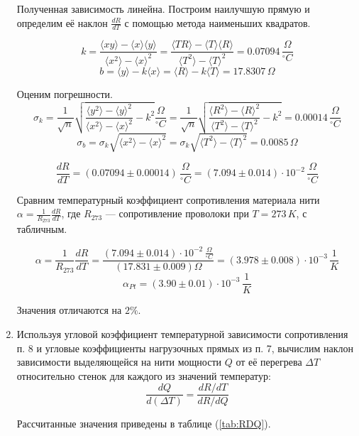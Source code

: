 \documentclass[a4paper,12pt]{article} %
\begin{document}
\begin{enumerate}
    Полученная зависимость линейна. Построим наилучшую прямую и определим её наклон $\frac{dR}{dT}$ с помощью метода наименьших квадратов. 

    \[
      k = \frac{\langle xy \rangle - \langle x \rangle \langle y \rangle}{\langle x^2 \rangle - \langle x \rangle ^2} 
      = \frac{\langle TR \rangle - \langle T \rangle \langle R \rangle}{\langle T^2 \rangle - \langle T \rangle ^2} 
      = 0.07094 \, \frac{{\Omega}}{^\circ C}
    \]
    \[
      b = \langle y \rangle - k \langle x \rangle 
      = \langle R \rangle - k \langle T \rangle = 17.8307 \, \Omega
    \]

    Оценим погрешности.
    \[
      \sigma_k = \frac{1}{\sqrt{n}} \sqrt{\frac{\langle y^2 \rangle - \langle y \rangle ^2}{\langle x^2 \rangle - \langle x \rangle ^2} - k^2} \frac{{\Omega}}{^\circ C}
      = \frac{1}{\sqrt{n}} \sqrt{\frac{\langle R^2 \rangle - \langle R \rangle ^2}{\langle T^2 \rangle - \langle T \rangle ^2} - k^2} 
      = 0.00014 \, \frac{{\Omega}}{^\circ C}
    \]
    \[
      \sigma_b = \sigma_k \sqrt{\langle x^2 \rangle - \langle x \rangle ^2} 
      = \sigma_k \sqrt{\langle T^2 \rangle - \langle T \rangle ^2} 
      = 0.0085 \,\Omega
    \]

    \[ 
      \frac{dR}{dT} = (0.07094 \pm 0.00014) \, \frac{{\Omega}}{^\circ C} = (7.094 \pm 0.014) \cdot 10^{-2} \, \frac{{\Omega}}{^\circ C}
    \]
    
    Сравним температурный коэффициент сопротивления материала нити $\alpha = \frac{1}{R_{273}} \frac{dR}{dT}$, где $R_{273}$ — сопротивление проволоки при $T = 273\, K$, с табличным.

    \[
      \alpha = \frac{1}{R_{273}} \frac{dR}{dT} = \frac{(7.094 \pm 0.014) \cdot 10^{-2} \, \frac{{\Omega}}{^\circ C}}{(17.831 \pm 0.009) \Omega} = (3.978 \pm 0.008) \cdot 10^{-3} \, \frac{1}{K}
    \]
    \[
      \alpha_{Pt} = (3.90 \pm 0.01) \cdot 10^{-3} \, \frac{1}{K}
    \]

    Значения отличаются на $2\%$.

    \item Используя угловой коэффициент температурной зависимости сопротивления п. 8 и угловые коэффициенты нагрузочных прямых из п. 7, вычислим наклон зависимости выделяющейся на нити мощности $Q$ от её перегрева $\Delta T$ относительно стенок для каждого из значений температур:
    \[
    \frac{dQ}{d(\Delta T)} = \frac{dR/dT}{dR/dQ}
    \]

    Рассчитанные значения приведены в таблице (\ref{tab:RDQ}).


\end{enumerate}
\end{document}
